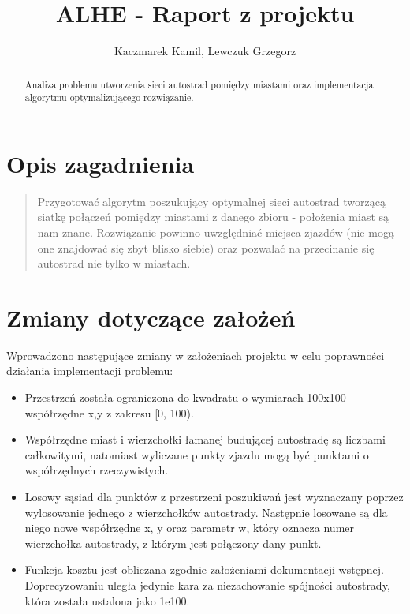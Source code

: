 \documentclass[a4paper]{article}
\title{ALHE - Raport z projektu}
\author{Kaczmarek Kamil, Lewczuk Grzegorz}
\begin{document}
\maketitle

\begin{abstract}
Analiza problemu utworzenia sieci autostrad pomiędzy miastami oraz implementacja algorytmu optymalizującego rozwiązanie.
\end{abstract}

\section{Opis zagadnienia}

\begin{quote}
Przygotować algorytm poszukujący optymalnej sieci autostrad tworzącą siatkę połączeń pomiędzy miastami z danego zbioru - położenia miast są nam znane. Rozwiązanie powinno uwzględniać miejsca zjazdów (nie mogą one znajdować się zbyt blisko siebie) oraz pozwalać na przecinanie się autostrad nie tylko w miastach.
\end{quote}

\section{Zmiany dotyczące założeń}

Wprowadzono następujące zmiany w założeniach projektu w celu poprawności działania implementacji problemu:

\begin{itemize}
\item Przestrzeń została ograniczona do kwadratu o wymiarach 100x100 – współrzędne x,y z zakresu [0, 100).
\item Współrzędne miast i wierzchołki łamanej budującej autostradę są liczbami całkowitymi, natomiast wyliczane punkty zjazdu mogą być punktami o współrzędnych rzeczywistych.
\item Losowy sąsiad dla punktów z przestrzeni poszukiwań jest wyznaczany poprzez wylosowanie jednego z wierzchołków autostrady. Następnie losowane są dla niego nowe współrzędne x, y oraz parametr w, który oznacza numer wierzchołka autostrady, z którym jest połączony dany punkt.
\item Funkcja kosztu jest obliczana zgodnie założeniami dokumentacji wstępnej. Doprecyzowaniu uległa jedynie kara za niezachowanie spójności autostrady, która została ustalona jako 1e100.
\end{itemize}
\end{document}
